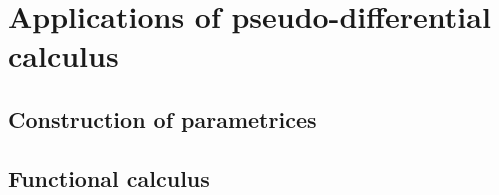 \chapter{Applications of pseudo-differential calculus}

\section{Construction of parametrices}

\section{Functional calculus}
